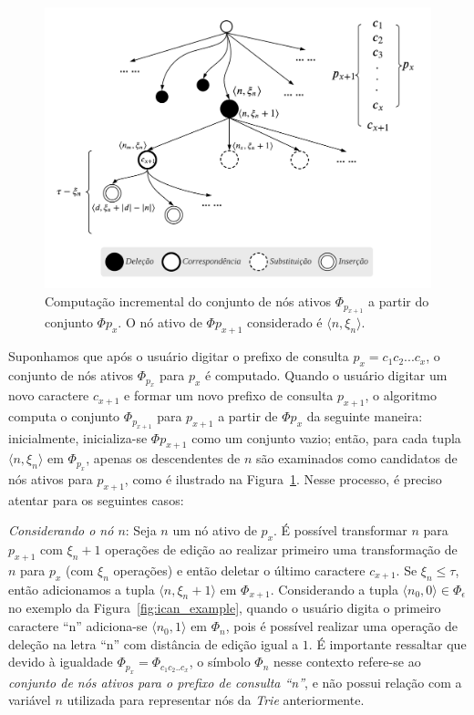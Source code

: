 \begin{figure}[ht]
    \centering
    \includegraphics[width=1\textwidth]{figures/incrementally_computing_active_node_set.png}
    \caption{Computação incremental do conjunto de nós ativos $\Phi_{p_{x+1}}$ a partir do conjunto $\Phi{p_{x}}.$ O nó ativo de $\Phi{p_{x+1}}$ considerado é $\langle n, \xi_{n} \rangle$.}
    \label{fig:incrementally_computing_active_node_set}
\end{figure}

Suponhamos que após o usuário digitar o prefixo de consulta $p_{x} = c_{1}c_{2}...c_{x}$, o conjunto de nós ativos $\Phi_{p_{x}}$ para $p_{x}$ é computado. Quando o usuário digitar um novo caractere $c_{x+1}$ e formar um novo prefixo de consulta $p_{x+1}$, o algoritmo computa o conjunto $\Phi_{p_{x+1}}$ para $p_{x+1}$ a partir de $\Phi{p_{x}}$ da seguinte maneira: inicialmente, inicializa-se $\Phi{p_{x+1}}$ como um conjunto vazio; então, para cada tupla $\langle n, \xi_{n} \rangle$ em $\Phi_{p_{x}}$, apenas os descendentes de $n$ são examinados como candidatos de nós ativos para $p_{x+1}$, como é ilustrado na Figura~\ref{fig:incrementally_computing_active_node_set}. Nesse processo, é preciso atentar para os seguintes casos:

\textit{Considerando o nó $n$}: Seja $n$ um nó ativo de $p_{x}$. É possível transformar $n$ para $p_{x+1}$ com $\xi_{n} + 1$ operações de edição ao realizar primeiro uma transformação de $n$ para $p_{x}$ (com $\xi_{n}$ operações) e então deletar o último caractere $c_{x+1}$. Se $\xi_{n} \leq \tau$, então adicionamos a tupla $\langle n, \xi_{n} + 1 \rangle$ em $\Phi_{x + 1}$. Considerando a tupla $\langle n_{0}, 0 \rangle \in \Phi_{\epsilon}$ no exemplo da Figura~\ref{fig:ican_example}, quando o usuário digita o primeiro caractere ``n'' adiciona-se $\langle n_{0}, 1 \rangle$ em $\Phi_{n}$, pois é possível realizar uma operação de deleção na letra ``n'' com distância de edição igual a $1$. É importante ressaltar que devido à igualdade $\Phi_{p_{x}} = \Phi_{c_{1}c_{2}..c_{x}}$, o símbolo $\Phi_{n}$ nesse contexto refere-se ao \textit{conjunto de nós ativos para o prefixo de consulta ``n''}, e não possui relação com a variável $n$ utilizada para representar nós da \textit{Trie} anteriormente.

